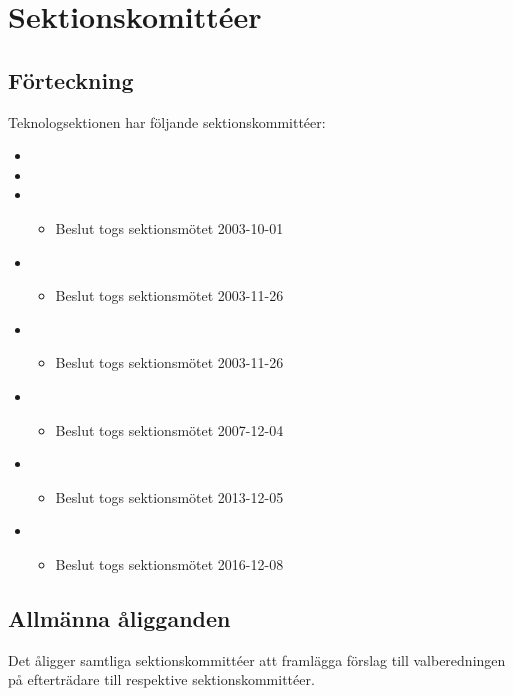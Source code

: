 \section{Sektionskomittéer}

\subsection{Förteckning}
Teknologsektionen har följande sektionskommittéer:

\begin{itemize}
	\item \SEXITFULL
	\item \NOLLKITFULL
	\item \PRITFULL
	\begin{itemize}
		\item Beslut togs sektionsmötet 2003-10-01
	\end{itemize}
	\item \FRITIDFULL
	\begin{itemize}
		\item Beslut togs sektionsmötet 2003-11-26
	\end{itemize}
	\item \ARMITFULL
	\begin{itemize}
		\item Beslut togs sektionsmötet 2003-11-26
	\end{itemize}
	\item \DIGITFULL
	\begin{itemize}
		\item Beslut togs sektionsmötet 2007-12-04 
	\end{itemize}
	\item \FANBARERITFULL
	\begin{itemize}
		\item Beslut togs sektionsmötet 2013-12-05 
	\end{itemize}
	\item \MRCITFULL
	\begin{itemize}
		\item Beslut togs sektionsmötet 2016-12-08
	\end{itemize}
\end{itemize}

\subsection{Allmänna åligganden}
Det åligger samtliga sektionskommittéer att framlägga förslag till valberedningen på efterträdare till respektive sektionskommittéer. 

\newpage

\newpage

\newpage

\newpage

\newpage

\newpage

\newpage

\newpage
